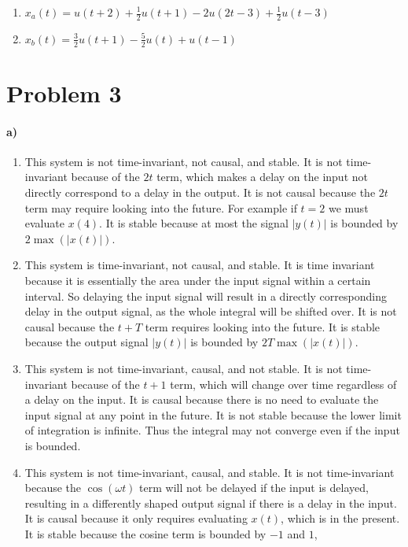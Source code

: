 \documentclass[12pt]{article}
\begin{document}
\begin{enumerate}
	\item \(x_a(t)=u(t+2)+\frac{1}{2}u(t+1)-2u(2t-3)+\frac{1}{2}u(t-3)\)
	\item \(x_b(t)=\frac{3}{2}u(t+1)-\frac{5}{2}u(t)+u(t-1)\)
\end{enumerate}

\section*{Problem 3}

\paragraph{a)}

\begin{enumerate}
	\item This system is not time-invariant, not causal, and stable. It is not time-invariant because of the \(2t\) term, which makes a delay on the input not directly correspond to a delay in the output.
	It is not causal because the \(2t\) term may require looking into the future. For example if \(t=2\) we must evaluate \(x(4)\). It is stable because at most the signal \(|y(t)|\) is bounded by
	\(2\max(|x(t)|)\).
	\item This system is time-invariant, not causal, and stable. It is time invariant because it is essentially the area under the input signal within a certain interval. So delaying the input signal will result
	in a directly corresponding delay in the output signal, as the whole integral will be shifted over. It is not causal because the \(t+T\) term requires looking into the future. It is stable because
	the output signal \(|y(t)|\) is bounded by \(2T\max(|x(t)|)\).
	\item This system is not time-invariant, causal, and not stable. It is not time-invariant because of the \(t+1\) term, which will change over time regardless of a delay on the input. It is causal
	because there is no need to evaluate the input signal at any point in the future. It is not stable because the lower limit of integration is infinite. Thus the integral may not converge even if the input
	is bounded.
	\item This system is not time-invariant, causal, and stable. It is not time-invariant because the \(\cos(\omega t)\) term will not be delayed if the input is delayed, resulting in a differently shaped
	output signal if there is a delay in the input. It is causal because it only requires evaluating \(x(t)\), which is in the present. It is stable because the cosine term is bounded by \(-1\) and \(1\),

\end{enumerate}
\end{document}
